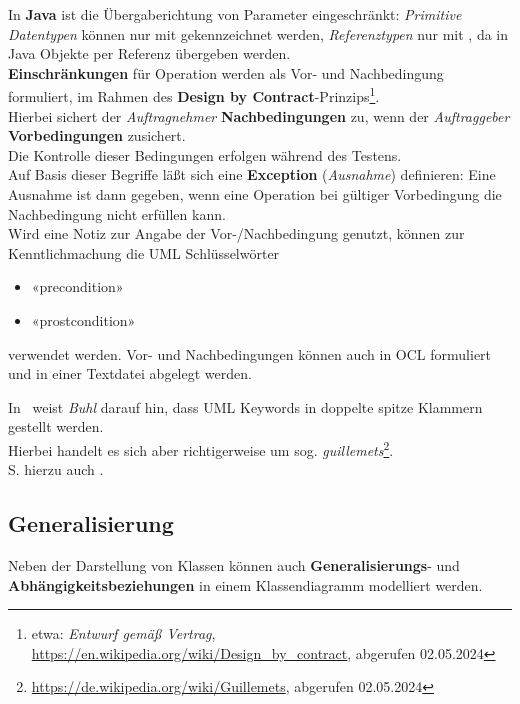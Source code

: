 \noindent
In \textbf{Java} ist die Übergaberichtung von Parameter eingeschränkt: \textit{Primitive Datentypen} können nur mit  gekennzeichnet werden, \textit{Referenztypen} nur mit , da in Java Objekte per Referenz übergeben werden.\\

\noindent
\textbf{Einschränkungen} für Operation werden als Vor- und Nachbedingung formuliert, im Rahmen des \textbf{Design by Contract}-Prinzips\footnote{
etwa: \textit{Entwurf gemäß Vertrag}, \url{https://en.wikipedia.org/wiki/Design_by_contract}, abgerufen 02.05.2024
}.\\
Hierbei sichert der \textit{Auftragnehmer} \textbf{Nachbedingungen} zu, wenn der \textit{Auftraggeber} \textbf{Vorbedingungen} zusichert.\\
Die Kontrolle dieser Bedingungen erfolgen während des Testens.\\
Auf Basis dieser Begriffe läßt sich eine \textbf{Exception} (\textit{Ausnahme}) definieren: Eine Ausnahme ist dann gegeben, wenn eine Operation bei gültiger Vorbedingung die Nachbedingung nicht erfüllen kann.\\

\noindent
Wird eine Notiz zur Angabe der Vor-/Nachbedingung genutzt, können zur Kenntlichmachung die UML Schlüsselwörter

\begin{itemize}
    \item[] «precondition»
    \item[] «prostcondition»
\end{itemize}

\noindent
verwendet werden.
Vor- und Nachbedingungen können auch in OCL formuliert und in einer Textdatei abgelegt werden.


\begin{tcolorbox}[title=Doppelte Spitze Klammern,colback=red!20]
    In~\cite[25]{Buh09} weist \textit{Buhl} darauf hin, dass UML Keywords in doppelte spitze Klammern gestellt werden.\\
    Hierbei handelt es sich aber richtigerweise um sog. \textit{guillemets}\footnote{
        \url{https://de.wikipedia.org/wiki/Guillemets}, abgerufen 02.05.2024
    }.\\
    S. hierzu auch \cite[745]{OMG17}.
\end{tcolorbox}

\subsection*{Generalisierung}
Neben der Darstellung von Klassen können auch \textbf{Generalisierungs}- und \textbf{Abhängigkeitsbeziehungen} in einem Klassendiagramm modelliert werden.\\

